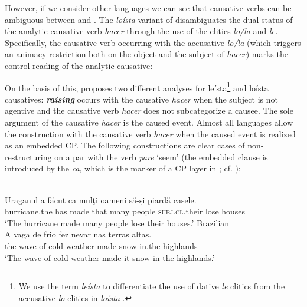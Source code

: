 \documentclass[output=paper]{langsci/langscibook}
\begin{document}
However, if we consider other languages we can see that causative verbs can be ambiguous between  and . The \textit{loísta} variant of  disambiguates the dual status of the analytic causative verb \textit{hacer} through the use of the clitics \textit{lo\slash la} and \textit{le.} Specifically, the causative verb occurring with the accusative \textit{lo\slash la} (which triggers an animacy restriction both on the object and the subject of \textit{hacer}) marks the control reading of the analytic causative:

\ea%
    \label{ex:moreno:7}
    \z
\z


On the basis of this, \citet{Torrego2010} proposes two different analyses for leísta\footnote{We use the term \textit{leísta} to differentiate the use of dative \textit{le} clitics from the accusative \textit{lo} clitics in \textit{loísta} .} and loísta causatives: \textbf{\textit{raising}} occurs with the causative \textit{hacer} when the subject is not agentive and the causative verb \textit{hacer} does not subcategorize a causee. The sole argument of the causative \textit{hacer} is the caused event. Almost all  languages allow the  construction with the causative verb \textit{hacer} when the caused event is realized as an embedded CP. The following constructions are clear cases of non-restructuring  on a par with the verb \textit{pare} ‘seem’ (the embedded clause is introduced by the  \textit{ca}, which is the marker of a CP layer in ; cf. \citealt{Alboiu2007}):

\ea%
    \label{ex:moreno:8}
    \ea  {}\\
    \gll Uraganul    a    făcut   ca   mulţi  oameni  să-și              piardă casele.   \\
         hurricane.the has made  that many people   \textsc{subj.cl}.their lose     houses \\
    \glt ‘The hurricane made many people lose their houses.’
    \ex  Brazilian \\
    \gll A   vaga  de frio     fez   nevar   nas     terras altas.  \\
         the wave of cold weather   made  snow  in.the highlands\\
    \glt ‘The wave of cold weather made it snow in the highlands.’ 
    \z
\z
\end{document}
